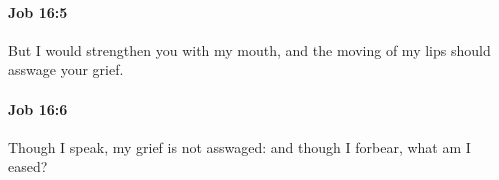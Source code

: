 		\paragraph{Job 16:5} %
			\label{JOB-16-5}

			But I would strengthen you with my mouth, and the moving of my lips should asswage your grief.


		\paragraph{Job 16:6} %
			\label{JOB-16-6}

			Though I speak, my grief is not asswaged: and though I forbear, what am I eased?


